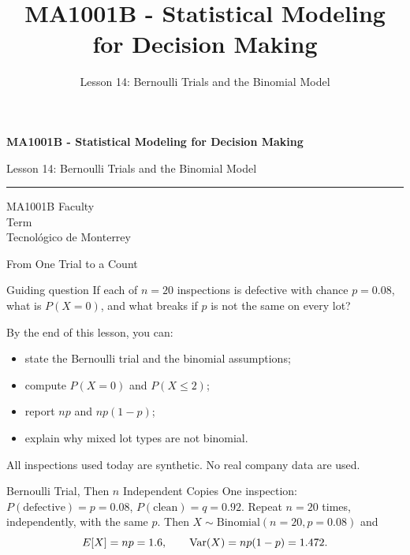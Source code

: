\documentclass[aspectratio=169,10pt,english]{beamer}
\title{MA1001B - Statistical Modeling for Decision Making}
\subtitle{Lesson 14: Bernoulli Trials and the Binomial Model}
\author{}
\institute{Tecnol\'ogico de Monterrey}
\date{}
\begin{document}
\begin{frame}[plain]
  \vspace{1.2cm}
  {\Large\bfseries MA1001B - Statistical Modeling for Decision Making\par}
  \vspace{0.7cm}
  {\large Lesson 14: Bernoulli Trials and the Binomial Model\par}
  \vspace{0.7cm}
  {\color{TecRojo}\rule{\textwidth}{1.2pt}}
  \vspace{0.8cm}

  MA1001B Faculty\\[0.3cm]
  Term\\[0.3cm]
  Tecnol\'ogico de Monterrey
\end{frame}

\begin{frame}{From One Trial to a Count}
  \begin{alertblock}{Guiding question}
    If each of $n=20$ inspections is defective with chance $p=0.08$, what is
    $P(X=0)$, and what breaks if $p$ is not the same on every lot?
  \end{alertblock}

  \vspace{0.6em}
  By the end of this lesson, you can:
  \begin{itemize}
    \item state the Bernoulli trial and the binomial assumptions;
    \item compute $P(X=0)$ and $P(X\le 2)$;
    \item report $np$ and $np(1-p)$;
    \item explain why mixed lot types are not binomial.
  \end{itemize}

  \vfill
  \scriptsize All inspections used today are synthetic. No real company data are used.
\end{frame}

\begin{frame}{Bernoulli Trial, Then $n$ Independent Copies}
  \small
  One inspection: $P(\text{defective})=p=0.08$, $P(\text{clean})=q=0.92$.
  Repeat $n=20$ times, independently, with the same $p$. Then
  $X\sim\mathrm{Binomial}(n=20,p=0.08)$ and
  \[
    E[X]=np=1.6,\qquad \operatorname{Var}(X)=np(1-p)=1.472.
  \]
\end{frame}
\end{document}
